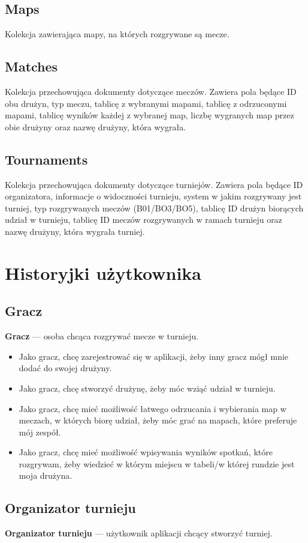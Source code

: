 \documentclass[shortabstract]{iithesis}
\theoremstyle{definition} \newtheorem{definition}{Definicja}[]
\theoremstyle{remark} \newtheorem{remark}[definition]{Observation}
\theoremstyle{plain} \newtheorem{theorem}[definition]{Theorem}
\theoremstyle{plain} \newtheorem{lemma}[definition]{Lemma}
\begin{document}
\subsection{Maps}
Kolekcja zawierająca mapy, na których rozgrywane są mecze.

\subsection{Matches}
Kolekcja przechowująca dokumenty dotyczące meczów. Zawiera pola będące ID obu drużyn, typ meczu, tablicę z wybranymi mapami, tablicę z odrzuconymi mapami, tablicę wyników każdej z wybranej map, liczbę wygranych map przez obie drużyny oraz nazwę drużyny, która wygrała.

\subsection{Tournaments}
Kolekcja przechowująca dokumenty dotyczące turniejów. Zawiera pola będące ID organizatora, informacje o widoczności turnieju, system w jakim rozgrywany jest turniej, typ rozgrywanych meczów (B01/BO3/BO5), tablicę ID drużyn biorących udział w turnieju, tablicę ID meczów rozgrywanych w ramach turnieju oraz nazwę drużyny, która wygrała turniej.

\section{Historyjki użytkownika}
\subsection{Gracz}
\textbf{Gracz} --- osoba chcąca rozgrywać mecze w turnieju.
\begin{itemize}
    \item Jako gracz, chcę zarejestrować się w aplikacji, żeby inny gracz mógł mnie dodać do swojej drużyny.
    \item Jako gracz, chcę stworzyć drużynę, żeby móc wziąć udział w turnieju.
    \item Jako gracz, chcę mieć możliwość łatwego odrzucania i wybierania map w meczach, w których biorę udział, żeby móc grać na mapach, które preferuje mój zespół.
    \item Jako gracz, chcę mieć możliwość wpisywania wyników spotkań, które rozgrywam, żeby wiedzieć w którym miejscu w tabeli/w której rundzie jest moja drużyna.
\end{itemize}

\subsection{Organizator turnieju}
\textbf{Organizator turnieju} --- użytkownik aplikacji chcący stworzyć turniej.
\end{document}
